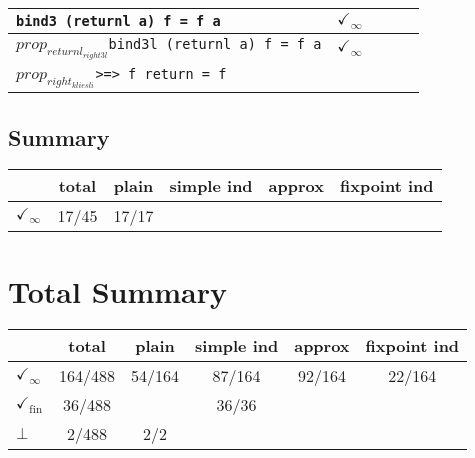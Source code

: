 \documentclass{article}
\begin{document}
\begin{longtable}{p{10cm} || c | c | c | c | }
\newline \verb`bind3 (returnl a) f = f a` & $\checkmark_{\infty}$ &  &  &  \\\hline$prop_{returnl_{right3l}}$\newline \verb`bind3l (returnl a) f = f a` & $\checkmark_{\infty}$ &  &  &  \\\hline$prop_{right_{kliesli}}$\newline \verb`>=> f return = f` &  &  &  &  \\\end{longtable}\subsection*{Summary}\begin{longtable}{p{4cm} || c | c | c | c | c | }  & total & plain & simple ind & approx & fixpoint ind \\\hline$\checkmark_{\infty}$ & 17/45 & 17/17 &  &  & \\\end{longtable}\section*{Total Summary}\begin{longtable}{p{4cm} || c | c | c | c | c | }  & total & plain & simple ind & approx & fixpoint ind \\\hline$\checkmark_{\infty}$ & 164/488 & 54/164 & 87/164 & 92/164 & 22/164\\\hline$\checkmark_{\mathrm{fin}}$ & 36/488 &  & 36/36 &  & \\\hline$\bot$ & 2/488 & 2/2 &  &  & \\\end{longtable}
\end{document}
